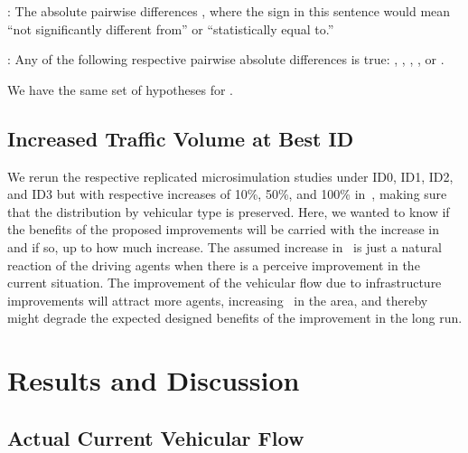 \documentclass[preprint]{./acm_proc_article-sp}
\begin{document}
: The absolute pairwise differences  , where the  sign in this sentence would mean ``not significantly different from'' or ``statistically equal to.''

: Any of the following respective pairwise absolute differences is true: ,  , , ,  or .

We have the same set of hypotheses for .

\subsection{Increased Traffic Volume at Best ID}

We rerun the respective replicated microsimulation studies under ID0, ID1, ID2, and ID3 but with respective increases of 10\%, 50\%, and 100\% in~, making sure that the distribution by vehicular type is preserved. Here, we wanted to know if the benefits of the proposed improvements will be carried with the increase in~ and if so, up to how much increase. The assumed increase in~  is just a natural reaction of the driving agents when there is a perceive improvement in the current situation. The improvement of the vehicular flow due to infrastructure improvements will attract more agents, increasing~ in the area, and thereby might degrade the expected designed benefits of the improvement in the long run.

\section{Results and Discussion}\label{sec:results}

\subsection{Actual Current Vehicular Flow}
\end{document}
